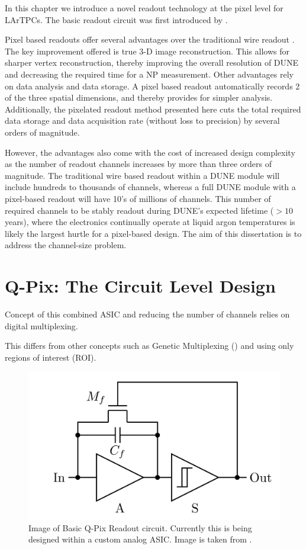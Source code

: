 In this chapter we introduce a novel readout technology at the pixel level for LArTPCs. 
The basic readout circuit was first introduced by \citep{qpix:nygren:mei}.

Pixel based readouts offer several advantages over the traditional wire readout \citep{lartpc_recon_problems_joshi_2015}.
The key improvement offered is true 3-D image reconstruction. 
This allows for sharper vertex reconstruction, thereby improving the overall resolution of DUNE and decreasing the required time for a NP measurement.
Other advantages rely on data analysis and data storage. 
A pixel based readout automatically records 2 of the three spatial dimensions, and thereby provides for simpler analysis.
Additionally, the pixelated readout method presented here cuts the total required data storage and data acquisition rate (without loss to precision) by several orders of magnitude.

However, the advantages also come with the cost of increased design complexity as the number of readout channels increases by more than three orders of magnitude. 
The traditional wire based readout within a DUNE module will include hundreds to thousands of channels, whereas a full DUNE module with a pixel-based readout will have 10's of millions of channels.
This number of required channels to be stably readout during DUNE's expected lifetime ($> 10$ years), where the electronics continually operate at liquid argon temperatures is likely the largest hurtle for a pixel-based design.
The aim of this dissertation is to address the channel-size problem.

\section{Q-Pix: The Circuit Level Design}

Concept of this combined ASIC and reducing the number of channels relies on digital multiplexing.

This differs from other concepts such as Genetic Multiplexing (\citep{PROCUREUR2013888_genetic_multiplexing}) and using only regions of interest (ROI).

\begin{figure}[]
\centering
\includegraphics[width=\textwidth]{images/qpix_circuit.jpg}
\caption{Image of Basic Q-Pix Readout circuit. Currently this is being designed within a custom analog ASIC. Image is taken from \citep{qpix:nygren:mei}.}
\end{figure}


